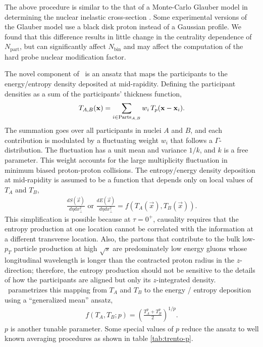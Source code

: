 The above procedure is similar to the that of a Monte-Carlo Glauber model in determining the nuclear inelastic cross-section \cite{Miller:2007ri}.
Some experimental versions of the Glauber model use a black disk proton instead of a Gaussian profile.
We found that this difference results in little change in the centrality dependence of $N_{\textrm{part}}$, but can significantly affect $N_{\textrm{bin}}$ and may affect the computation of the hard probe nuclear modification factor.

The novel component of \trento\ is an ansatz that maps the participants to the energy/entropy density deposited at mid-rapidity.
Defining the participant densities as a sum of the participants' thickness function,
\begin{equation}
T_{A, B}(\mathbf x) = \sum_{i\in \textrm{Parts}_{A, B}} w_i\, T_p(\mathbf x - \mathbf x_i).
\end{equation}
The summation goes over all participants in nuclei $A$ and $B$, and each contribution is modulated by a fluctuating weight $w_i$ that follows a $\Gamma$-distribution.
The fluctuation has a unit mean and variance $1/k$, and $k$ is a free parameter.
This weight accounts for the large multiplicity fluctuation in minimum biased proton-proton collisions.
The entropy/energy density deposition at mid-rapidity is assumed to be a function that depends only on local values of $T_A$ and $T_B$,
\begin{eqnarray}
\frac{dS(\vec{x})}{d\eta dx_\perp^2} \textrm{ or } \frac{dE(\vec{x})}{d\eta dx_\perp^2} = f(T_A(\vec{x}), T_B(\vec{x})).
\end{eqnarray}
This simplification is possible because at $\tau=0^+$, causality requires that the entropy production at one location cannot be correlated with the information at a different transverse location. 
Also, the partons that contribute to the bulk low-$p_T$ particle production at high $\sqrt{s}$ are predominately low energy gluons whose longitudinal wavelength is longer than the contracted proton radius in the $z$-direction; therefore, the entropy production should not be sensitive to the details of how the participants are aligned but only its $z$-integrated density.
\trento\ parametrizes this mapping from $T_A$ and $T_B$ to the energy / entropy deposition using a ``generalized mean'' ansatz,
\begin{eqnarray}
f(T_A, T_B; p) = \left(\frac{T_A^p + T_B^p}{2}\right)^{1/p}.
\end{eqnarray}
$p$ is another tunable parameter.
Some special values of $p$ reduce the ansatz to well known averaging procedures as shown in table \ref{tab:trento-p}.
